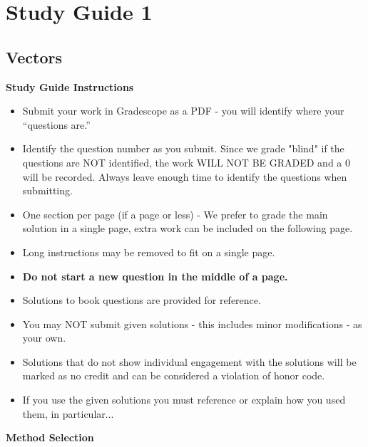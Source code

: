 \clearpage
\chapter{Study Guide 1}

\section{Vectors}

\begin{center}
    \large{\textbf{Study Guide Instructions}}
\end{center}


\begin{itemize}
    \item Submit your work in Gradescope as a PDF - you will identify where your “questions are.”
    \item Identify the question number as you submit.  Since we grade "blind" if the questions are NOT identified, the work WILL NOT BE GRADED and a 0 will be recorded. Always leave enough time to 
    identify the questions when submitting.
    \item One section per page (if a page or less) - We prefer to grade the main solution in a single page, extra work can be included on the following page.
    \item Long instructions may be removed to fit on a single page.
    \item \textbf{Do not start a new question in the middle of a page.}
    \item Solutions to book questions are provided for reference.
    \item You may NOT submit given solutions - this includes minor modifications - as your own.
    \item Solutions that do not show individual engagement with the solutions will be marked as no credit and can be considered a violation of honor code.
    \item If you use the given solutions you must reference or explain how you used them, in particular...
\end{itemize}


\begin{center}
    \large{\textbf{Method Selection}}
\end{center}


